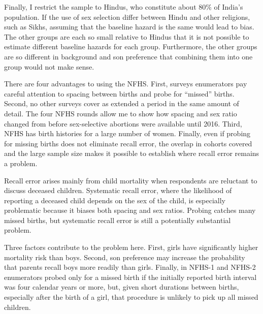 \documentclass[12pt,letterpaper]{article}
\begin{document}
Finally, I restrict the sample to Hindus,
who constitute about 80\% of India's population.
If the use of sex selection differ between Hindu and other religions, such 
as Sikhs, assuming that the baseline hazard is the same would lead to bias.
The other groups are each so small relative to Hindus that it is not
possible to estimate different baseline hazards for each group.
Furthermore, the other groups are so different in background and son 
preference that combining them into one group would not make sense.

There are four advantages to using the NFHS.
First, surveys enumerators pay careful attention to spacing between births and
probe for ``missed'' births.
Second, no other surveys cover as extended a period in the same amount of detail.
The four NFHS rounds allow me to show how spacing and 
sex ratio changed from before sex-selective abortions were available until 2016.
Third, NFHS has birth histories for a large number of women.
Finally, even if probing for missing births does not eliminate recall error,   
the overlap in cohorts covered and the large sample size makes it possible 
to establish where recall error remains a problem.

Recall error arises mainly from child mortality when respondents are 
reluctant to discuss deceased children.
Systematic recall error, where the likelihood of reporting a deceased 
child depends on the sex of the child, is especially problematic because 
it biases both spacing and sex ratios.
Probing catches many missed births, but systematic recall error is 
still a potentially substantial problem.

Three factors contribute to the problem here.
First, girls have significantly higher mortality risk than boys.
Second, son preference may increase the probability that parents recall boys 
more readily than girls.
Finally, in NFHS-1 and NFHS-2 enumerators probed only for a missed birth if the
initially reported birth interval was four calendar years or more,
but, given short durations between births, especially after the birth of a girl,
that procedure is unlikely to pick up all missed children.
\end{document}
